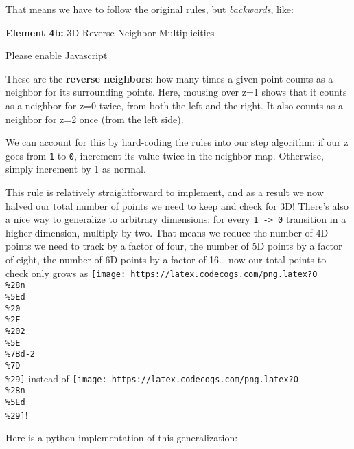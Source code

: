 \documentclass[]{article}
\begin{document}
That means we have to follow the original rules, but \emph{backwards}, like:

\leavevmode\hypertarget{golSyms3DReverse}{}%
\textbf{Element 4b:} 3D Reverse Neighbor Multiplicities

\leavevmode\hypertarget{golSyms3DReverseCont}{}%
Please enable Javascript

These are the \textbf{reverse neighbors}: how many times a given point counts as
a neighbor for its surrounding points. Here, mousing over z=1 shows that it
counts as a neighbor for z=0 twice, from both the left and the right. It also
counts as a neighbor for z=2 once (from the left side).

We can account for this by hard-coding the rules into our step algorithm: if our
z goes from \texttt{1} to \texttt{0}, increment its value twice in the neighbor
map. Otherwise, simply increment by 1 as normal.

This rule is relatively straightforward to implement, and as a result we now
halved our total number of points we need to keep and check for 3D! There's also
a nice way to generalize to arbitrary dimensions: for every
\texttt{1\ -\textgreater{}\ 0} transition in a higher dimension, multiply by
two. That means we reduce the number of 4D points we need to track by a factor
of four, the number of 5D points by a factor of eight, the number of 6D points
by a factor of 16\ldots{} now our total points to check only grows as
\texttt{[image: https://latex.codecogs.com/png.latex?O\\\%28n\\\%5Ed\\\%20\\\%2F\\\%202\\\%5E\\\%7Bd-2\\\%7D\\\%29]}
instead of
\texttt{[image: https://latex.codecogs.com/png.latex?O\\\%28n\\\%5Ed\\\%29]}!

Here is a python implementation of this generalization:
\end{document}
